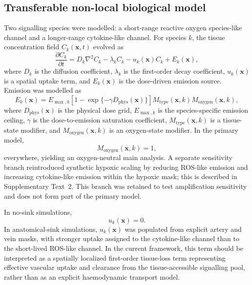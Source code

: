 \documentclass[10pt,a4paper]{article}
\newcommand{\Dphys}{D_{\mathrm{phys}}}
\begin{document}
\subsection{Transferable non-local biological model}
Two signalling species were modelled: a short-range reactive oxygen species-like channel and a longer-range cytokine-like channel. For species $k$, the tissue concentration field $C_k(\mathbf{x},t)$ evolved as
\begin{equation}
\frac{\partial C_k}{\partial t}
=
D_k \nabla^2 C_k
-
\lambda_k C_k
-
u_k(\mathbf{x}) C_k
+
E_k(\mathbf{x}),
\end{equation}
where $D_k$ is the diffusion coefficient, $\lambda_k$ is the first-order decay coefficient, $u_k(\mathbf{x})$ is a spatial uptake term, and $E_k(\mathbf{x})$ is the dose-driven emission source. Emission was modelled as
\begin{equation}
E_k(\mathbf{x})
=
E_{\max,k}
\left[
1-\exp\{-\gamma \Dphys(\mathbf{x})\}
\right]
M_{\mathrm{type}}(\mathbf{x},k)
M_{\mathrm{oxygen}}(\mathbf{x},k),
\end{equation}
where $\Dphys(\mathbf{x})$ is the physical dose grid, $E_{\max,k}$ is the species-specific emission ceiling, $\gamma$ is the dose-to-emission saturation coefficient, $M_{\mathrm{type}}(\mathbf{x},k)$ is a tissue-state modifier, and $M_{\mathrm{oxygen}}(\mathbf{x},k)$ is an oxygen-state modifier. In the primary model,
\begin{equation}
M_{\mathrm{oxygen}}(\mathbf{x},k)=1,
\end{equation}
everywhere, yielding an oxygen-neutral main analysis. A separate sensitivity branch reintroduced synthetic hypoxic scaling by reducing ROS-like emission and increasing cytokine-like emission within the hypoxic mask; this is described in Supplementary Text~2. This branch was retained to test amplification sensitivity and does not form part of the primary model.

In no-sink simulations,
\begin{equation}
u_k(\mathbf{x})=0.
\end{equation}
In anatomical-sink simulations, $u_k(\mathbf{x})$ was populated from explicit artery and vein masks, with stronger uptake assigned to the cytokine-like channel than to the short-lived ROS-like channel. In the current framework, this term should be interpreted as a spatially localized first-order tissue-loss term representing effective vascular uptake and clearance from the tissue-accessible signalling pool, rather than as an explicit haemodynamic transport model.
\end{document}
